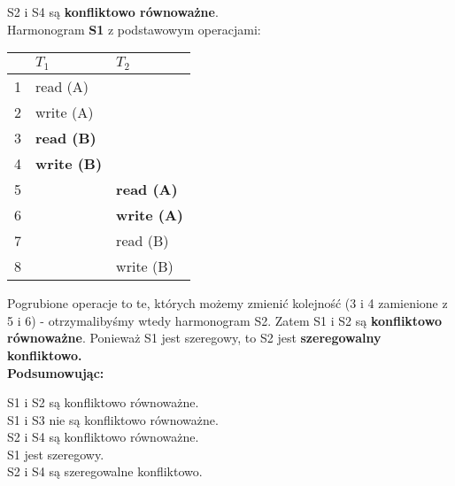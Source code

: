 \documentclass[main.tex]{subfiles}
\begin{document}
    S2 i S4 są \textbf{konfliktowo równoważne}.\\


    \noindent Harmonogram \textbf{S1} z podstawowym operacjami:
    \begin{table}[H]
        \begin{center}
            \begin{tabular}{| p{0.8cm} | p{6cm} | p{6cm} |}
                \hline
                & $T_1$ & $T_2$\\
                \hline
                \hline
                1 & read (A) &\\
                \hline
                2 & write (A) &\\
                \hline
                3 & \textbf{read (B)}&\\
                \hline
                4 & \textbf{write (B)}&\\
                \hline
                5 & & \textbf{read (A)}\\
                \hline
                6 & & \textbf{write (A)}\\
                \hline
                7 & & read (B)\\
                \hline
                8 & & write (B)\\
                \hline
            \end{tabular}
        \end{center}
    \end{table}

    Pogrubione operacje to te, których możemy zmienić kolejność (3 i 4 zamienione z 5 i 6) - otrzymalibyśmy wtedy
    harmonogram S2. Zatem S1 i S2 są \textbf{konfliktowo równoważne}. Ponieważ S1 jest szeregowy, to S2 jest
    \textbf{szeregowalny konfliktowo.}\\

    \textbf{Podsumowując:}
    \begin{center}
        S1 i S2 są konfliktowo równoważne.\\
        S1 i S3 nie są konfliktowo równoważne.\\
        S2 i S4 są konfliktowo równoważne.\\
        S1 jest szeregowy.\\
        S2 i S4 są szeregowalne konfliktowo.\\
    \end{center}
\end{document}
